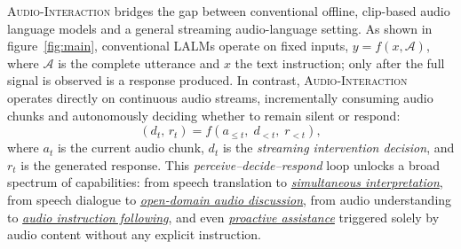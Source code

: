 \documentclass{llmxive}
\begin{document}
 \textsc{Audio-Interaction}  bridges the gap between conventional offline, clip-based audio language models and a general streaming audio-language setting. As shown in figure~\ref{fig:main}, conventional LALMs operate on fixed inputs, $y = f(x, \mathcal{A})$, where $\mathcal{A}$ is the complete utterance and $x$ the text instruction; only after the full signal is observed is a response produced. In contrast,  \textsc{Audio-Interaction}  operates directly on continuous audio streams, incrementally consuming audio chunks and autonomously deciding whether to remain silent or respond:
\begin{equation}
    (d_t,\, r_t) = f\!\left(a_{\leq t},\; d_{<t},\; r_{<t}\right),
\end{equation}
where $a_t$ is the current audio chunk, $d_t$ is the \emph{streaming intervention decision}, and $r_t$ is the generated response. This \emph{perceive--decide--respond} loop unlocks a broad spectrum of capabilities: from speech translation to \underline{\emph{simultaneous interpretation}}, from speech dialogue to \underline{\emph{open-domain audio discussion}}, from audio understanding to \underline{\emph{audio instruction following}}, and even \underline{\emph{proactive assistance}} triggered solely by audio content without any explicit instruction.
\vspace{-1mm}

\end{document}
